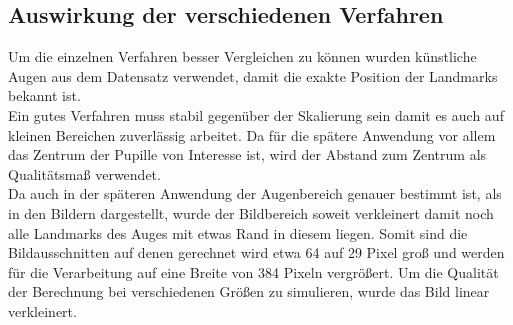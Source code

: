 \subsection{Auswirkung der verschiedenen Verfahren}
Um die einzelnen Verfahren besser Vergleichen zu können wurden künstliche Augen aus dem Datensatz \cite{database_Eye} verwendet, damit die exakte Position der Landmarks bekannt ist.\\
Ein gutes Verfahren muss stabil gegenüber der Skalierung sein damit es auch auf kleinen Bereichen zuverlässig arbeitet. Da für die spätere Anwendung vor allem das Zentrum der Pupille von Interesse ist, wird der Abstand zum Zentrum als Qualitätsmaß verwendet.\\
Da auch in der späteren Anwendung der Augenbereich genauer bestimmt ist, als in den Bildern dargestellt, wurde der Bildbereich soweit verkleinert damit noch alle Landmarks des Auges mit etwas Rand in diesem liegen. Somit sind die Bildausschnitten auf denen gerechnet wird etwa 64 auf 29 Pixel groß und werden für die Verarbeitung auf eine Breite von 384 Pixeln vergrößert. Um die Qualität der Berechnung bei verschiedenen Größen zu simulieren, wurde das Bild linear verkleinert.\\
